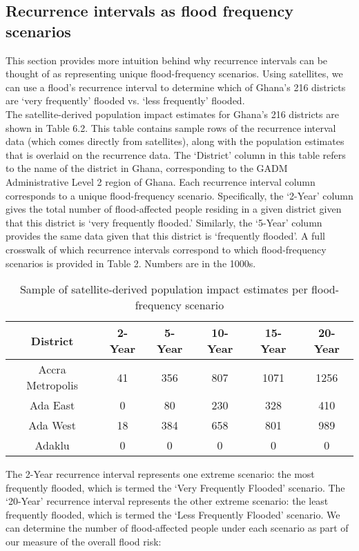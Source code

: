 \subsection{Recurrence intervals as flood frequency scenarios}

This section provides more intuition behind why recurrence intervals can be thought of as representing unique flood-frequency scenarios. Using satellites, we can use a flood’s recurrence interval to determine which of Ghana’s 216 districts are ‘very frequently’ flooded vs. ‘less frequently’ flooded.\\

The satellite-derived population impact estimates for Ghana’s 216 districts are shown in Table 6.2. This table contains sample rows of the recurrence interval data (which comes directly from satellites), along with the population estimates that is overlaid on the recurrence data. The ‘District’ column in this table refers to the name of the district in Ghana, corresponding to the GADM Administrative Level 2 region of Ghana. Each recurrence interval column corresponds to a unique flood-frequency scenario. Specifically, the ‘2-Year’ column gives the total number of flood-affected people residing in a given district given that this district is ‘very frequently flooded.’ Similarly, the ‘5-Year’ column provides the same data given that this district is ‘frequently flooded’. A full crosswalk of which recurrence intervals correspond to which flood-frequency scenarios is provided in Table 2. Numbers are in the 1000s.\\

\begin{table}
\centering
\begin{tabular}{|c|c|c|c|c|c|}
\hline
\textbf{District} & \textbf{2-Year} & \textbf{5-Year} & \textbf{10-Year} & \textbf{15-Year} & \textbf{20-Year}\\
\hline
Accra Metropolis\rule{0pt}{4ex} & 41 & 356 & 807 & 1071 & 1256 \\
Ada East\rule{0pt}{4ex} & 0 & 80 & 230 & 328 & 410 \\
Ada West\rule{0pt}{4ex} & 18 & 384 & 658 & 801 & 989 \\
Adaklu\rule{0pt}{4ex} & 0 & 0 & 0 & 0 & 0 \\
\hline
\end{tabular}
\caption{Sample of satellite-derived population impact estimates per flood-frequency scenario}
\end{table}

The 2-Year recurrence interval represents one extreme scenario: the most frequently flooded, which is termed the ‘Very Frequently Flooded’ scenario. The ‘20-Year’ recurrence interval represents the other extreme scenario: the least frequently flooded, which is termed the ‘Less Frequently Flooded’ scenario. We can determine the number of flood-affected people under each scenario as part of our measure of the overall flood risk:

